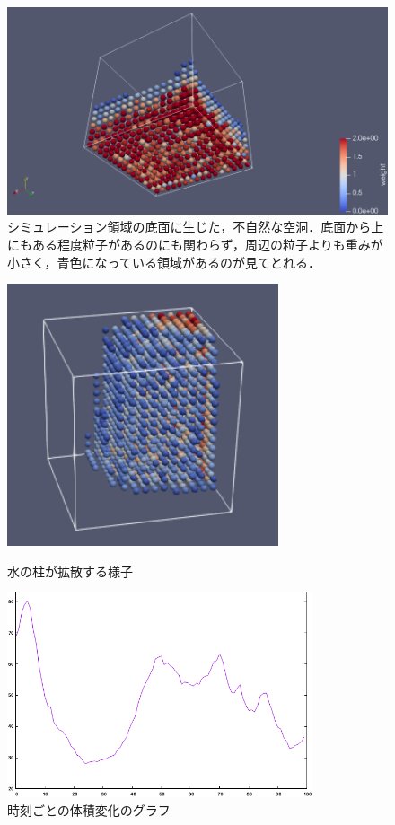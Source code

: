 \documentclass[a4j,12pt]{jreport}
\begin{document}
\begin{figure}[htbp]
\begin{center}
\includegraphics[width=140mm]{artificial_space.png}
\end{center}
\caption{シミュレーション領域の底面に生じた，不自然な空洞．底面から上にもある程度粒子があるのにも関わらず，周辺の粒子よりも重みが小さく，青色になっている領域があるのが見てとれる．}
\label{fig:space}
\end{figure}

\begin{figure}[htbp]
  \begin{minipage}[b]{0.5\linewidth}
    \centering
    \includegraphics[width=80mm]{disipassion.png}
    \caption{水の柱が拡散する様子}
     \label{fig:disipassion}
  \end{minipage}
  \begin{minipage}[b]{0.5\linewidth}
    \centering
    \includegraphics[width=90mm]{graph.png}
    \caption{時刻ごとの体積変化のグラフ}
     \label{fig:graph}
  \end{minipage}
 
\end{figure}
\end{document}
